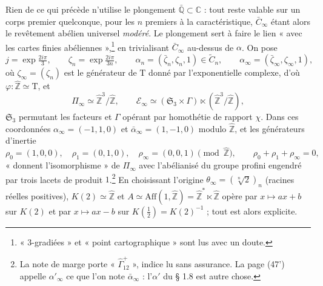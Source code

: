 \documentclass[11pt,a4paper]{article}
\begin{document}
Rien de ce qui précède n'utilise le plongement $\bar{\mathbb{Q}} \subset
\mathbb{C}$ : tout reste valable sur un corps premier quelconque, pour les $n$
premiers à la caractéristique, $\bar{C}_{\infty}$ étant alors le revêtement
abélien universel \emph{modéré}. Le plongement sert à faire le lien « avec les
cartes finies abéliennes »,\footnote{« 3-gradiées » et « point cartographique »
sont lus avec un doute.} en trivialisant $\bar{C}_{\infty}$ au-dessus de
$\alpha$. On pose
\[
j = \exp\tfrac{2i\pi}{3}, \qquad \zeta_{n} = \exp\tfrac{2i\pi}{3n}, \qquad
\alpha_{n} = (\bar{\zeta}_{n}, \zeta_{n}, 1) \in \widetilde{C}_{n}, \qquad
\alpha_{\infty} = (\bar{\zeta}_{\infty}, \zeta_{\infty}, 1),
\]
où $\zeta_{\infty} = (\zeta_{n})$ est le générateur de $\mathrm{T}$ donné par
l'exponentielle complexe, d'où $\varphi : \widehat{\mathbb{Z}} \simeq
\mathrm{T}$, et
\[
\Pi_{\infty} \simeq \widehat{\mathbb{Z}}^{3}/\widehat{\mathbb{Z}}, \qquad
\mathcal{E}_{\infty} \simeq (\mathfrak{S}_{3} \times \Gamma) \ltimes
(\widehat{\mathbb{Z}}^{3}/\widehat{\mathbb{Z}}),
\]
$\mathfrak{S}_{3}$ permutant les facteurs et $\Gamma$ opérant par homothétie de
rapport $\chi$. Dans ces coordonnées $\alpha_{\infty} = (-1, 1, 0)$ et
$\bar{\alpha}_{\infty} = (1, -1, 0)$ modulo $\widehat{\mathbb{Z}}$, et les
générateurs d'inertie
\[
\rho_{0} = (1,0,0), \quad \rho_{1} = (0,1,0), \quad \rho_{\infty} = (0,0,1)
\pmod{\widehat{\mathbb{Z}}}, \qquad \rho_{0} + \rho_{1} + \rho_{\infty} = 0,
\]
« donnent l'isomorphisme » de $\Pi_{\infty}$ avec l'abélianisé du groupe
profini engendré par trois lacets de produit $1$.\footnote{La note de marge
porte « $\widehat{\Gamma}^{+}_{12}$ », indice lu sans assurance. La page
(47') appelle $\alpha'_{\infty}$ ce que l'on note $\bar{\alpha}_{\infty}$ :
l'$\alpha'$ du § 1.8 est autre chose.} En choisissant l'origine $\theta_{\infty}
= (\sqrt[n]{2})_{n}$ (racines réelles positives), $K(2) \simeq \widehat{\mathbb{Z}}$
et $A \simeq \mathrm{Aff}(1, \widehat{\mathbb{Z}}) = \widehat{\mathbb{Z}}^{*}
\ltimes \widehat{\mathbb{Z}}$ opère par $x \mapsto ax + b$ sur $K(2)$ et par $x
\mapsto ax - b$ sur $K(\tfrac12) = K(2)^{-1}$ ; tout est alors explicite.
\end{document}
